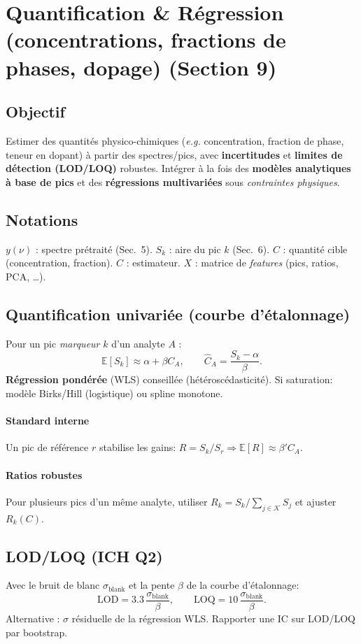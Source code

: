 
\section{Quantification \& Régression (concentrations, fractions de phases, dopage) (Section 9)}

\subsection{Objectif}
Estimer des quantités physico-chimiques (\emph{e.g.} concentration, fraction de phase, teneur en dopant) à partir des spectres/pics, avec \textbf{incertitudes} et \textbf{limites de détection (LOD/LOQ)} robustes. Intégrer à la fois des \textbf{modèles analytiques à base de pics} et des \textbf{régressions multivariées} sous \emph{contraintes physiques}.

\subsection{Notations}
$y(\nu)$ : spectre prétraité (Sec.~5). $S_k$ : aire du pic $k$ (Sec.~6). $C$ : quantité cible (concentration, fraction). $\hat{C}$ : estimateur. $X$ : matrice de \emph{features} (pics, ratios, PCA, \ldots).

\subsection{Quantification univariée (courbe d'étalonnage)}
Pour un pic \emph{marqueur} $k$ d'un analyte $A$ :
\begin{equation}
\mathbb{E}[S_k] \approx \alpha + \beta C_A,\qquad \hat{C}_A = \frac{S_k - \alpha}{\beta}.
\end{equation}
\textbf{Régression pondérée} (WLS) conseillée (hétéroscédasticité). Si saturation: modèle Birks/Hill (logistique) ou spline monotone.
\paragraph{Standard interne} Un pic de référence $r$ stabilise les gains: $R = S_k / S_r \Rightarrow \mathbb{E}[R] \approx \beta' C_A$.
\paragraph{Ratios robustes} Pour plusieurs pics d'un même analyte, utiliser $R_{k} = S_k / \sum_{j\in\mathcal{K}} S_j$ et ajuster $R_k(C)$.

\subsection{LOD/LOQ (ICH Q2)}
Avec le bruit de blanc $\sigma_{\mathrm{blank}}$ et la pente $\beta$ de la courbe d'étalonnage:
\begin{equation}
\mathrm{LOD} = 3.3\, \frac{\sigma_{\mathrm{blank}}}{\beta},\qquad
\mathrm{LOQ} = 10\, \frac{\sigma_{\mathrm{blank}}}{\beta}.
\end{equation}
Alternative : $\sigma$ résiduelle de la régression WLS. Rapporter une IC sur LOD/LOQ par bootstrap.


